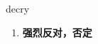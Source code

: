 
\begin{frame}
{\huge decry}
\begin{center}
\begin{enumerate}\Large
  \item \textbf{强烈反对，否定}
\end{enumerate}
\end{center}
\end{frame}
